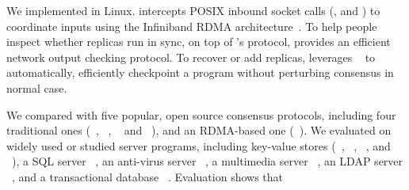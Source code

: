 


We implemented \xxx in Linux. \xxx intercepts POSIX inbound socket calls
(\eg, \accept and \recv) to coordinate inputs using the Infiniband
RDMA architecture~\cite{infiniband}. To help people inspect whether replicas 
run in sync, on top of \xxx's \paxos protocol, \xxx provides an efficient 
network output checking protocol. To recover or add replicas, \xxx 
leverages \criu~\cite{criu} to automatically, efficiently checkpoint a program 
without perturbing consensus in normal case.


We compared \xxx with five popular, open source consensus protocols,
including four traditional ones (\libpaxos~\cite{libpaxos},
\zookeeper~\cite{zookeeper}, \crane~\cite{crane:sosp15} and
\spaxos~\cite{spaxos:srds12}), and an RDMA-based one 
(\dare~\cite{dare:hpdc15}). We evaluated \xxx on \nprog widely used or studied 
server programs, including
\nkvprog key-value stores (\redis~\cite{redis}, \memcached~\cite{memcached},
\ssdb~\cite{ssdb}, and \mongodb~\cite{mongodb}), a SQL server
\mysql~\cite{mysql}, an anti-virus server \clamav~\cite{clamav}, a multimedia
server \mediatomb~\cite{mediatomb}, an LDAP server \openldap~\cite{openldap}, 
and a transactional database \calvin~\cite{calvin:sigmod12}. Evaluation shows 
that

